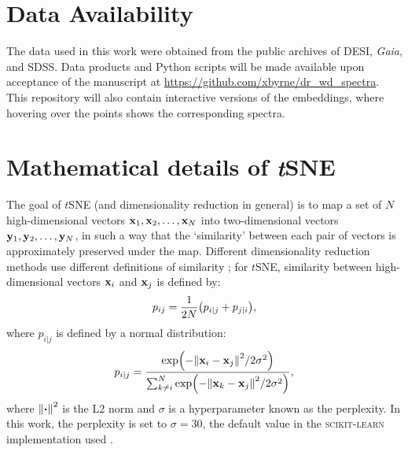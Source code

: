 \documentclass[fleqn,usenatbib]{mnras}
\def\xb{\vb{x}}
\def\yb{\vb{y}}
\begin{document}
\section*{Data Availability}

The data used in this work were obtained from the public archives of DESI, \textit{Gaia}, and SDSS.
Data products and Python scripts will be made available upon acceptance of the manuscript at \url{https://github.com/xbyrne/dr_wd_spectra}.
This repository will also contain interactive versions of the embeddings, where hovering over the points shows the corresponding spectra. 









\appendix

\section{Mathematical details of \textit{t}SNE}
\label{sec:app}

The goal of $t$SNE (and dimensionality reduction in general) is to map a set of $N$ high-dimensional vectors $\xb_1, \xb_2, \dots, \xb_N$ into two-dimensional vectors $\yb_1, \yb_2, \dots, \yb_N$, in such a way that the `similarity' between each pair of vectors is approximately preserved under the map.
Different dimensionality reduction methods use different definitions of similarity \citep{umap}; for $t$SNE, similarity between high-dimensional vectors $\xb_i$ and $\xb_j$ is defined by:
\begin{equation}
p_{ij}
= \frac{1}{2N} \qty(
    p_{i|j} + p_{j|i}
),
\end{equation}
where $p_{i|j}$ is defined by a normal distribution:
\begin{equation}
p_{i|j}
= \frac{
    \exp(-\norm{\xb_i - \xb_j}^2 / 2\sigma^2)
}{
    \sum_{k\neq i}^N
    \exp(-\norm{\xb_k - \xb_j}^2 / 2\sigma^2)
},
\end{equation}
where $\norm{\vdot}^2$ is the L2 norm and $\sigma$ is a hyperparameter known as the perplexity.
In this work, the perplexity is set to $\sigma=30$, the default value in the \textsc{scikit-learn} implementation used \citep{sklearn}.
\end{document}
